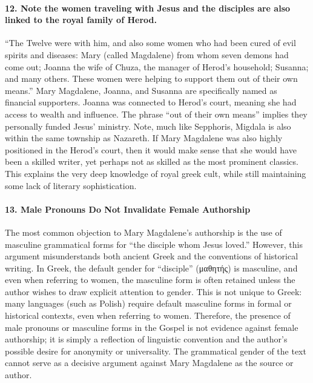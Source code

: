 \paragraph{12.
Note the women traveling with Jesus and the disciples are also linked to the royal family of Herod.}\label{par:note-the-women-traveling-with-jesus-and-the-disciples-are-also-linked-to-the-royal-family-of-herod.}

``The Twelve were with him, and also some women who had been cured of evil spirits and diseases: Mary (called Magdalene) from whom seven demons had come out; Joanna the wife of Chuza, the manager of Herod's household; Susanna; and many others.
These women were helping to support them out of their own means.'' Mary Magdalene, Joanna, and Susanna are specifically named as financial supporters.
Joanna was connected to Herod's court, meaning she had access to wealth and influence.
The phrase ``out of their own means'' implies they personally funded Jesus' ministry.
Note, much like Sepphoris, Migdala is also within the same township as Nazareth.
If Mary Magdalene was also highly positioned in the Herod's court, then it would make sense that she would have been a skilled writer, yet perhaps not as skilled as the most prominent classics.
This explains the very deep knowledge of royal greek cult, while still maintaining some lack of literary sophistication.

\paragraph{13.
Male Pronouns Do Not Invalidate Female Authorship}\label{par:the-authorship-of-mary-is-typically-dismissed-as-a-possibility-because-of-the-use-of-male-pronouns-in-the-gospel.}

The most common objection to Mary Magdalene’s authorship is the use of masculine grammatical forms for “the disciple whom Jesus loved.” However, this argument misunderstands both ancient Greek and the conventions of historical writing. In Greek, the default gender for “disciple” (μαθητής) is masculine, and even when referring to women, the masculine form is often retained unless the author wishes to draw explicit attention to gender. This is not unique to Greek: many languages (such as Polish) require default masculine forms in formal or historical contexts, even when referring to women. Therefore, the presence of male pronouns or masculine forms in the Gospel is not evidence against female authorship; it is simply a reflection of linguistic convention and the author’s possible desire for anonymity or universality. The grammatical gender of the text cannot serve as a decisive argument against Mary Magdalene as the source or author.


